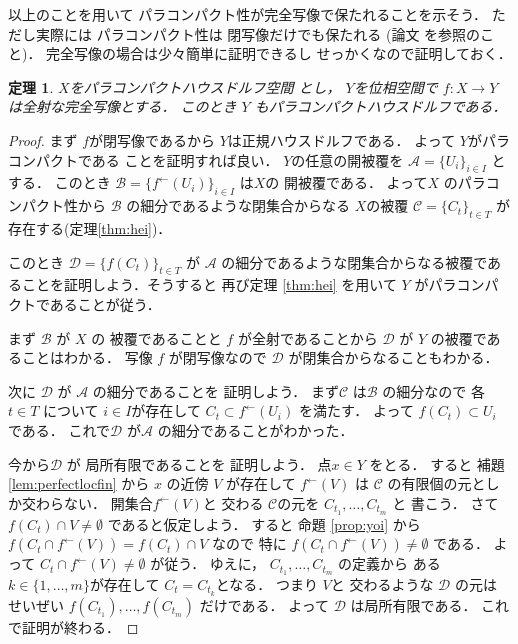 \documentclass[leqno, a4paper, 12pt]{jsarticle}
\newtheorem{thm}{定理}
\newcommand{\myinv}[1]{#1^{\gets}}
\begin{document}
以上のことを用いて
パラコンパクト性が完全写像で保たれることを示そう．
ただし実際には
パラコンパクト性は
閉写像だけでも保たれる
(論文
\cite{MR0087079}を参照のこと)．
完全写像の場合は少々簡単に証明できるし
せっかくなので証明しておく．
\begin{thm}\label{thm:perfectpara}
$X$をパラコンパクトハウスドルフ空間
とし，
$Y$を位相空間で
$f\colon X\to Y$
は全射な完全写像とする．
このとき
$Y$
もパラコンパクトハウスドルフである．
\end{thm}
\begin{proof}
まず
$f$が閉写像であるから
$Y$は正規ハウスドルフである．
よって
$Y$がパラコンパクトである
ことを証明すれば良い．
$Y$の任意の開被覆を
$\mathcal{A}=\{U_{i}\}_{i\in I}$
とする．
このとき
$\mathcal{B}=\{\myinv{f}(U_{i})\}_{i\in I}$
は$X$の
開被覆である．
よって$X$
のパラコンパクト性から
$\mathcal{B}$
の細分であるような閉集合からなる
$X$の被覆
$\mathcal{C}=\{C_{t}\}_{t\in T}$
が
存在する(定理\ref{thm:hei})．

このとき
$\mathcal{D}=\{f(C_{t})\}_{t\in T}$
が
$\mathcal{A}$
の細分であるような閉集合からなる被覆であることを証明しよう．そうすると
再び定理
\ref{thm:hei}
を用いて
$Y$
がパラコンパクトであることが従う．



まず
$\mathcal{B}$
が
$X$
の
被覆であることと
$f$
が全射であることから
$\mathcal{D}$
が
$Y$
の被覆であることはわかる．
写像
$f$
が閉写像なので
$\mathcal{D}$
が閉集合からなることもわかる．



次に
$\mathcal{D}$
が
$\mathcal{A}$
の細分であることを
証明しよう．
まず$\mathcal{C}$
は$\mathcal{B}$
の細分なので
各$t\in T$
について
$i\in I$が存在して
$C_{t}\subset \myinv{f}(U_{i})$
を満たす．
よって
$f(C_{t})\subset U_{i}$
である．
これで$\mathcal{D}$
が$\mathcal{A}$
の細分であることがわかった．

今から$\mathcal{D}$
が
局所有限であることを
証明しよう．
点$x\in Y$
をとる．
すると
補題\ref{lem:perfectlocfin}
から
$x$
の近傍
$V$
が存在して
$\myinv{f}(V)$
は
$\mathcal{C}$
の有限個の元としか交わらない．
開集合$\myinv{f}(V)$と
交わる
$\mathcal{C}$の元を
$C_{t_{1}}, \dots, C_{t_{m}}$
と
書こう．
さて
$f(C_{t})\cap V\neq \emptyset$
であると仮定しよう．
すると
命題
\ref{prop:yoi}
から
$f(C_{t}\cap \myinv{f}(V))=f(C_{t})\cap V$
なので
特に
$f(C_{t}\cap \myinv{f}(V))\neq \emptyset$
である．
よって
$C_{t}\cap \myinv{f}(V)\neq \emptyset$
が従う．
ゆえに，
$C_{t_{1}}, \dots, C_{t_{m}}$
の定義から
ある$k\in \{1, \dots, m\}$が存在して
$C_{t}=C_{t_{k}}$となる．
つまり
$V$と
交わるような
$\mathcal{D}$
の元は
せいぜい
$f(C_{t_{1}}), \dots, f(C_{t_{m}})$
だけである．
よって
$\mathcal{D}$
は局所有限である．
これで証明が終わる．
\end{proof}
\end{document}
